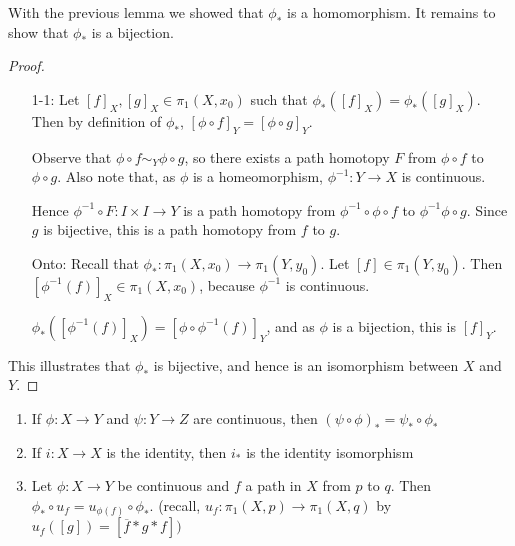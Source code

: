 With the previous lemma we showed that $\phi_*$ is a homomorphism. It remains to show that $\phi_*$ is a bijection. 
\begin{proof}
	\begin{itemize}
		\item[1-1:] Let $[f]_X, [g]_X\in \pi_1(X,x_0)$ such that $\phi_* ([f]_X)=\phi_*([g]_X)$. Then by definition of $\phi_*$, $[\phi\circ f]_Y=[\phi\circ g]_Y$. 
		
		Observe that $\phi\circ f\sim_Y \phi\circ g$, so there exists a path homotopy $F$ from $\phi\circ f$ to $\phi\circ g$. Also note that, as $\phi$ is a homeomorphism, $\phi^{-1}:Y\to X$ is continuous.
		
		Hence $\phi^{-1}\circ F:I\times I \to Y$ is a path homotopy from $\phi^{-1}\circ \phi\circ f$ to $\phi^{-1}\phi\circ g.$ Since $g$ is bijective, this is a path homotopy from $f$ to $g$.
		
		\item[Onto:] Recall that $\phi_*:\pi_1(X,x_0)\to \pi_1(Y,y_0)$. Let $[f]\in \pi_1(Y,y_0)$. Then $[\phi^{-1}(f)]_X\in \pi_1(X,x_0)$, because $\phi^{-1}$ is continuous.
		
		$\phi_*([\phi^{-1}(f)]_X)=[\phi\circ \phi^{-1}(f)]_Y$, and as $\phi$ is a bijection, this is $[f]_Y$. 
	\end{itemize}
	
	This illustrates that $\phi_*$ is bijective, and hence is an isomorphism between $X$ and $Y$. 
\end{proof}
\begin{smallfact}
	\begin{enumerate}
		\item If $\phi: X\to Y$ and $\psi: Y\to Z$ are continuous, then $(\psi \circ \phi)_* = \psi_* \circ \phi_*$ 
		\item If $i:X\to X$ is the identity, then $i_*$ is the identity isomorphism 
		\item Let $\phi:X\to Y$ be continuous and $f$ a path in $X$ from $p$ to $q$. Then $\phi_\ast \circ u_f = u_{\phi(f)}\circ \phi_*$. (recall, $u_f:\pi_1 (X,p) \to \pi_1(X,q)$ by $u_f([g]) = [\overline{f} \ast g \ast f ] )$ 
	\end{enumerate}
\end{smallfact}

